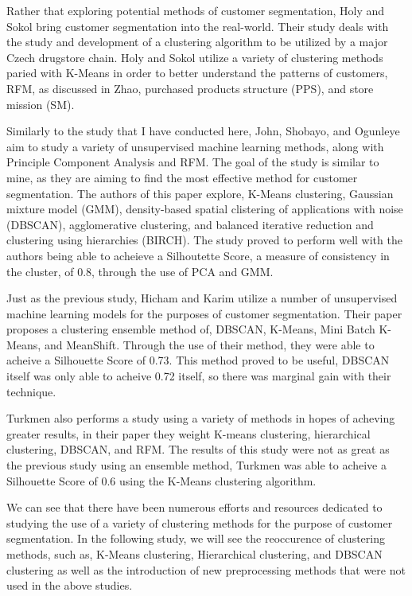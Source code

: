 \documentclass[twocolumn]{article}
\begin{document}
Rather that exploring potential methods of customer segmentation, Holy and Sokol bring customer segmentation into the real-world. Their study deals with the study and development of a clustering algorithm to be utilized by a major Czech drugstore chain.\cite{sokol} Holy and Sokol utilize a variety of clustering methods paried with K-Means in order to better understand the patterns of customers, RFM, as discussed in Zhao,\cite{zhao} purchased products structure (PPS), and store mission (SM).

Similarly to the study that I have conducted here, John, Shobayo, and Ogunleye aim to study a variety of unsupervised machine learning methods, along with Principle Component Analysis and RFM.\cite{john} The goal of the study is similar to mine, as they are aiming to find the most effective method for customer segmentation. The authors of this paper explore, K-Means clustering, Gaussian mixture model (GMM), density-based spatial clistering of applications with noise (DBSCAN), agglomerative clustering, and balanced iterative reduction and clustering using hierarchies (BIRCH).\cite{john} The study proved to perform well with the authors being able to acheieve a Silhoutette Score, a measure of consistency in the cluster, of 0.8, through the use of PCA and GMM.\cite{john}

Just as the previous study, Hicham and Karim utilize a number of unsupervised machine learning models for the purposes of customer segmentation. Their paper proposes a clustering ensemble method of, DBSCAN, K-Means, Mini Batch K-Means, and MeanShift. Through the use of their method, they were able to acheive a Silhouette Score of 0.73.\cite{hicham} This method proved to be useful, DBSCAN itself was only able to acheive 0.72 itself, so there was marginal gain with their technique.\cite{hicham}

Turkmen also performs a study using a variety of methods in hopes of acheving greater results, in their paper they weight K-means clustering, hierarchical clustering, DBSCAN, and RFM.\cite{turkmen} The results of this study were not as great as the previous study using an ensemble method, Turkmen was able to acheive a Silhouette Score of 0.6 using the K-Means clustering algorithm.\cite{turkmen} 

We can see that there have been numerous efforts and resources dedicated to studying the use of a variety of clustering methods for the purpose of customer segmentation. In the following study, we will see the reoccurence of clustering methods, such as, K-Means clustering, Hierarchical clustering, and DBSCAN clustering as well as the introduction of new preprocessing methods that were not used in the above studies.
\end{document}
